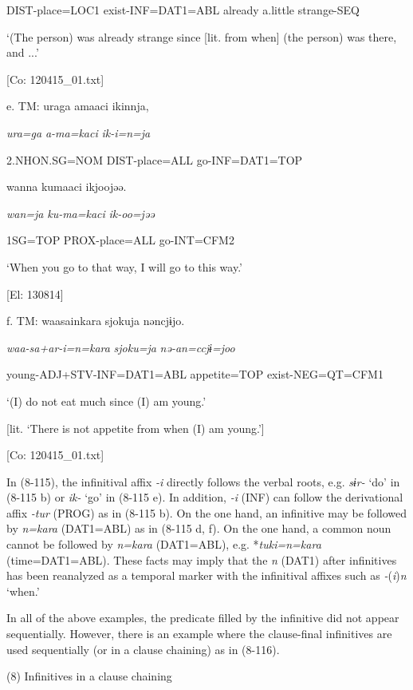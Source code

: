       DIST-place=LOC1  exist-INF=DAT1=ABL  already  a.little  strange-SEQ

      ‘(The person) was already strange since [lit. from when] (the person) was there, and ...’

      [Co: 120415\_01.txt]

  e.  TM:  uraga  amaaci  ikinnja,

      \textit{ura=ga}  \textit{a-ma=kaci}  \textit{ik-i=n=ja}

      2.NHON.SG=NOM  DIST-place=ALL  go-INF=DAT1=TOP

      wanna  kumaaci  ikjoojəə.

      \textit{wan=ja}  \textit{ku-ma=kaci}  \textit{ik-oo=jəə}

      1SG=TOP  PROX-place=ALL  go-INT=CFM2

      ‘When you go to that way, I will go to this way.’

      [El: 130814]

  f.  TM:  waasainkara  {\textbar}sjoku{\textbar}ja  nəncjɨjo.

      \textit{waa-sa+ar-i=n=kara}  \textit{sjoku=ja}  \textit{nə-an=ccjɨ=joo}

      young-ADJ+STV-INF=DAT1=ABL  appetite=TOP  exist-NEG=QT=CFM1

      ‘(I) do not eat much since (I) am young.’

[lit. ‘There is not appetite from when (I) am young.’]

      [Co: 120415\_01.txt]

In (8-115), the infinitival affix \textit{{}-i} directly follows the verbal roots, e.g. \textit{sɨr-} ‘do’ in (8-115 b) or \textit{ik-} ‘go’ in (8-115 e). In addition, \textit{{}-i} (INF) can follow the derivational affix \textit{{}-tur} (PROG) as in (8-115 b). On the one hand, an infinitive may be followed by \textit{n=kara} (DAT1=ABL) as in (8-115 d, f). On the one hand, a common noun cannot be followed by \textit{n=kara} (DAT1=ABL), e.g. *\textit{tuki=n=kara} (time=DAT1=ABL). These facts may imply that the \textit{n} (DAT1) after infinitives has been reanalyzed as a temporal marker with the infinitival affixes such as \textit{-}(\textit{i})\textit{n} ‘when.’

In all of the above examples, the predicate filled by the infinitive did not appear sequentially. However, there is an example where the clause-final infinitives are used sequentially (or in a clause chaining) as in (8-116). 

(8)  Infinitives in a clause chaining

